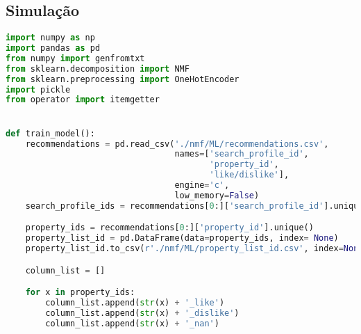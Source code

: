 \begin{apendicesenv}

\partapendices \chapter{Simulação}
\label{apendice}



\lstset{style=mystyle}

\begin{lstlisting}[language=Python, caption=API - NMF Machine Learning Code]
import numpy as np
import pandas as pd
from numpy import genfromtxt
from sklearn.decomposition import NMF
from sklearn.preprocessing import OneHotEncoder
import pickle
from operator import itemgetter


def train_model():
    recommendations = pd.read_csv('./nmf/ML/recommendations.csv',
                                  names=['search_profile_id',
                                         'property_id',
                                         'like/dislike'],
                                  engine='c',
                                  low_memory=False)
    search_profile_ids = recommendations[0:]['search_profile_id'].unique()

    property_ids = recommendations[0:]['property_id'].unique()
    property_list_id = pd.DataFrame(data=property_ids, index= None)
    property_list_id.to_csv(r'./nmf/ML/property_list_id.csv', index=None, header=True)

    column_list = []

    for x in property_ids:
        column_list.append(str(x) + '_like')
        column_list.append(str(x) + '_dislike')
        column_list.append(str(x) + '_nan')


\end{lstlisting}
\end{apendicesenv}
